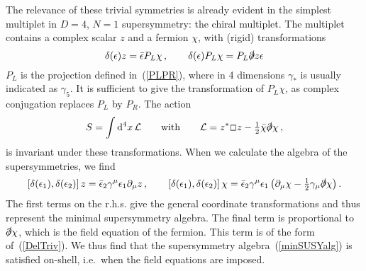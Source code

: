 \documentclass[a4paper,11pt,twoside]{article}
\newcommand{\OliveGreen}[1]{#1}
\newcommand{\Blue}[1]{#1}
\newcommand{\ft}[2]{{\textstyle\frac{#1}{#2}}}
\def\rmd{{\rm d}}
\newcommand{\bbox}{\lower.2ex\hbox{$\Box$}}
\begin{document}
The relevance of these trivial symmetries is already evident in the
simplest multiplet in $D=4$, $N=1$ supersymmetry: the chiral multiplet.
The multiplet contains a complex scalar $\Blue{z}$ and a fermion
$\Blue{\chi }$, with (rigid) transformations
\begin{equation}
  \delta(\OliveGreen{\epsilon }) \Blue{z}= \OliveGreen{\bar \epsilon}P_L
  \Blue{\chi}\,, \qquad
 \delta(\OliveGreen{\epsilon })P_L\Blue{\chi }  =  P_L\slashed \partial \Blue{z}\OliveGreen{\epsilon}
 \label{transfosChiralM}
\end{equation}
$P_L$ is the projection defined in~(\ref{PLPR}), where in 4 dimensions
$\gamma _*$ is usually indicated as $\gamma _5$. It is sufficient to give
the transformation of $P_L\chi $, as complex conjugation replaces $P_L$
by $P_R$. The action
\begin{equation}
  S=\int \rmd^4 x \,{\cal L} \qquad \mbox{with} \qquad {\cal L}=\Blue{z^*}\bbox \Blue{z}-\ft12\Blue{\bar \chi }\slashed\partial \Blue{\chi
  }\,,
 \label{Schiral}
\end{equation}
is invariant under these transformations. When we calculate the algebra
of the supersymmetries, we find
\begin{equation}
   \left[ \delta(\OliveGreen{\epsilon_1}),\delta(\OliveGreen{\epsilon_2 })\right] \Blue{z} =
 \OliveGreen{\bar \epsilon_2}\gamma ^\mu \OliveGreen{\epsilon _1}\partial _\mu \Blue{z}
 \,,\qquad
   \left[ \delta(\OliveGreen{\epsilon_1}),\delta(\OliveGreen{\epsilon_2 })\right] \Blue{\chi }  =
  \OliveGreen{\bar \epsilon_2}\gamma ^\mu \OliveGreen{\epsilon _1}\left(\partial _\mu\Blue{\chi }
  -\ft12\gamma _\mu \slashed\partial \Blue{\chi }\right).
 \label{algChiral}
\end{equation}
The first terms on the r.h.s. give the general coordinate transformations
and thus represent the minimal supersymmetry algebra. The final term is
proportional to $\slashed\partial \Blue{\chi }$, which is the field
equation of the fermion. This term is of the form of~(\ref{DelTriv}). We
thus find that the supersymmetry algebra~(\ref{minSUSYalg}) is satisfied
on-shell, i.e.\ when the field equations are imposed.
\end{document}
